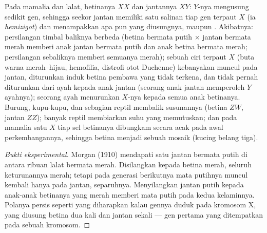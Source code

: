 \begin{proposition}\label{prop:b2:meiosis-heredity:sexlinked}
Pada mamalia dan lalat, betinanya $XX$ dan jantannya $XY$: $Y$-nya
mengusung sedikit gen, sehingga seekor jantan memiliki satu salinan
tiap gen terpaut $X$ (ia \emph{hemizigot}) dan menampakkan  apa pun
yang diusungnya,  maupun . Akibatnya: persilangan timbal
baliknya berbeda (betina bermata putih $\times$ jantan bermata merah
memberi anak jantan bermata putih dan anak betina bermata merah;
persilangan sebaliknya memberi semuanya merah); sebuah ciri 
terpaut $X$ (buta warna merah--hijau, hemofilia, distrofi otot
Duchenne) kebanyakan muncul pada jantan, diturunkan induk betina
pembawa yang tidak terkena, dan tidak pernah diturunkan dari ayah
kepada anak jantan (seorang anak jantan memperoleh $Y$ ayahnya);
seorang ayah menurunkan $X$-nya kepada semua anak betinanya. Burung,
kupu-kupu, dan sebagian reptil membalik susunannya (betina $ZW$,
jantan $ZZ$); banyak reptil membiarkan suhu yang memutuskan; dan pada
mamalia satu $X$ tiap sel betinanya dibungkam secara acak pada awal
perkembangannya, sehingga betina  menjadi sebuah mosaik
(kucing belang tiga).
\end{proposition}
\begin{proof}[Bukti eksperimental]
Morgan (1910) mendapati satu jantan bermata putih di antara ribuan
lalat bermata merah. Disilangkan kepada betina merah, seluruh
keturunannya merah; tetapi pada generasi berikutnya mata putihnya
muncul kembali hanya pada jantan, separuhnya. Menyilangkan jantan putih
kepada anak-anak betinanya yang merah memberi mata putih pada kedua
kelaminnya. Polanya persis seperti yang diharapkan kalau gennya duduk
pada kromosom X, yang diusung betina dua kali dan jantan sekali ---
gen pertama yang ditempatkan pada sebuah kromosom.
\end{proof}

